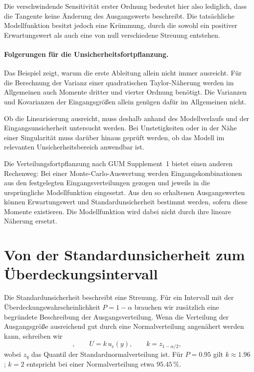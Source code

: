 Die verschwindende Sensitivität erster Ordnung bedeutet
hier also lediglich, dass die Tangente keine Änderung
des Ausgangswerts beschreibt. Die tatsächliche
Modellfunktion besitzt jedoch eine Krümmung, durch die
sowohl ein positiver Erwartungswert als auch eine
von null verschiedene Streuung entstehen.

\paragraph{Folgerungen für die Unsicherheitsfortpflanzung.}

Das Beispiel zeigt, warum die erste Ableitung allein
nicht immer ausreicht. Für die Berechnung der Varianz
einer quadratischen Taylor-Näherung werden im Allgemeinen
auch Momente dritter und vierter Ordnung benötigt.
Die Varianzen und Kovarianzen der Eingangsgrößen allein
genügen dafür im Allgemeinen nicht.

Ob die Linearisierung ausreicht, muss deshalb anhand des
Modellverlaufs und der Eingangsunsicherheit untersucht werden.
Bei Unstetigkeiten oder in der Nähe einer Singularität muss
darüber hinaus geprüft werden, ob das Modell im relevanten
Unsicherheitsbereich anwendbar ist.

Die Verteilungsfortpflanzung nach GUM Supplement~1 bietet einen
anderen Rechenweg: Bei einer Monte-Carlo-Auswertung werden
Eingangskombinationen aus den festgelegten Eingangsverteilungen
gezogen und jeweils in die ursprüngliche Modellfunktion
eingesetzt. Aus den so erhaltenen Ausgangswerten können
Erwartungswert und Standardunsicherheit bestimmt werden,
sofern diese Momente existieren. Die Modellfunktion wird
dabei nicht durch ihre lineare Näherung ersetzt.

\section{Von der Standardunsicherheit zum Überdeckungsintervall}
\label{sec:Ueberdeckungsintervall10}

Die Standardunsicherheit beschreibt eine Streuung. Für ein Intervall mit
der Überdeckungs\-wahr\-schein\-lich\-keit $P=1-\alpha$ brauchen wir zusätzlich
eine begründete Beschreibung der Ausgangsverteilung. Wenn die Verteilung der Ausgangsgröße ausreichend gut durch eine Normalverteilung angenähert werden kann, schreiben wir
\begin{equation}
[y-U,y+U],\qquad
U=k\,u_{\mathrm c}(y),\qquad k=z_{1-\alpha/2},
\label{eq:ErweiterteUnsicherheitNormal10}
\end{equation}
wobei $z_q$ das Quantil der Standardnormalverteilung ist.
Für $P=0.95$ gilt $k\approx1.96$; $k=2$ entspricht bei einer
Normalverteilung etwa $95.45\,\%$.

